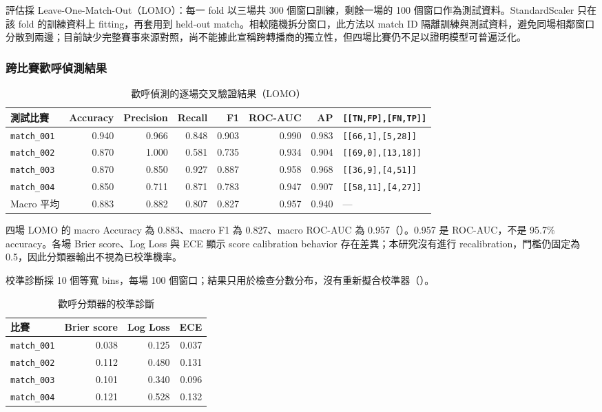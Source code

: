 評估採 Leave-One-Match-Out（LOMO）：每一 fold 以三場共 300 個窗口訓練，剩餘一場的 100 個窗口作為測試資料。StandardScaler 只在該 fold 的訓練資料上 fitting，再套用到 held-out match。相較隨機拆分窗口，此方法以 match ID 隔離訓練與測試資料，避免同場相鄰窗口分散到兩邊；目前缺少完整賽事來源對照，尚不能據此宣稱跨轉播商的獨立性，但四場比賽仍不足以證明模型可普遍泛化。

\subsubsection{跨比賽歡呼偵測結果}

\begin{table}[htbp]
  \centering
  \small
  \caption{歡呼偵測的逐場交叉驗證結果（LOMO）}
  \label{tab:cheer-lomo}
  \begin{tabular}{|l|r|r|r|r|r|r|l|}
    \hline
    測試比賽 & Accuracy & Precision & Recall & F1 & ROC-AUC & AP & \texttt{[[TN,FP],[FN,TP]]} \\ \hline
    \texttt{match\_001} & 0.940 & 0.966 & 0.848 & 0.903 & 0.990 & 0.983 & \texttt{[[66,1],[5,28]]} \\ \hline
    \texttt{match\_002} & 0.870 & 1.000 & 0.581 & 0.735 & 0.934 & 0.904 & \texttt{[[69,0],[13,18]]} \\ \hline
    \texttt{match\_003} & 0.870 & 0.850 & 0.927 & 0.887 & 0.958 & 0.968 & \texttt{[[36,9],[4,51]]} \\ \hline
    \texttt{match\_004} & 0.850 & 0.711 & 0.871 & 0.783 & 0.947 & 0.907 & \texttt{[[58,11],[4,27]]} \\ \hline
    Macro 平均 & 0.883 & 0.882 & 0.807 & 0.827 & 0.957 & 0.940 & — \\ \hline
  \end{tabular}
\end{table}

四場 LOMO 的 macro Accuracy 為 0.883、macro F1 為 0.827、macro ROC-AUC 為 0.957（）。0.957 是 ROC-AUC，不是 95.7\% accuracy。各場 Brier score、Log Loss 與 ECE 顯示 score calibration behavior 存在差異；本研究沒有進行 recalibration，門檻仍固定為 0.5，因此分類器輸出不視為已校準機率。

校準診斷採 10 個等寬 bins，每場 100 個窗口；結果只用於檢查分數分布，沒有重新擬合校準器（）。

\begin{table}[htbp]
  \centering
  \small
  \caption{歡呼分類器的校準診斷}
  \label{tab:cheer-calibration}
  \begin{tabular}{|l|r|r|r|}
    \hline
    比賽 & Brier score & Log Loss & ECE \\ \hline
    \texttt{match\_001} & 0.038 & 0.125 & 0.037 \\ \hline
    \texttt{match\_002} & 0.112 & 0.480 & 0.131 \\ \hline
    \texttt{match\_003} & 0.101 & 0.340 & 0.096 \\ \hline
    \texttt{match\_004} & 0.121 & 0.528 & 0.132 \\ \hline
  \end{tabular}
\end{table}

